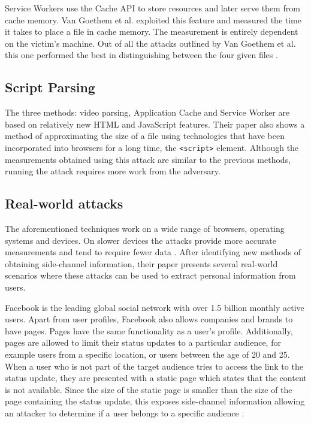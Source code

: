 \documentclass[10pt,a4paper,twoside]{book}
\begin{document}
Service Workers use the Cache API to store resources and later serve them from cache memory. Van Goethem et al. exploited this feature and measured the time it takes to place a file in cache memory. The measurement is entirely dependent on the victim's machine. Out of all the attacks outlined by Van Goethem et al. this one performed the best in distinguishing between the four given files \cite{van2015clock}.

\subsection{Script Parsing}
The three methods: video parsing, Application Cache and Service Worker are based on relatively new HTML and JavaScript features. Their paper also shows a method of approximating the size of a file using technologies that have been incorporated into browsers for a long time, the \texttt{<script>} element. Although the measurements obtained using this attack are similar to the previous methods, running the attack requires more work from the adversary.

\subsection{Real-world attacks}
The aforementioned techniques work on a wide range of browsers, operating systems and devices. On slower devices the attacks provide more accurate measurements and tend to require fewer data \cite{van2015clock}. After identifying new methods of obtaining side-channel information, their paper  presents several real-world scenarios where these attacks can be used to extract personal information from users. 

Facebook is the leading global social network with over 1.5 billion monthly active users. Apart from user profiles, Facebook also allows companies and brands to have pages. Pages have the same functionality as a user's profile. Additionally, pages are allowed to limit their status updates to a particular audience, for example users from a specific location, or users between the age of 20 and 25. When a user who is not part of the target audience tries to access the link to the status update, they are presented with a static page which states that the content is not available. Since the size of the static page is smaller than the size of the page containing the status update, this exposes side-channel information allowing an attacker to determine if a user belongs to a specific audience \cite{van2015clock}.
\end{document}
